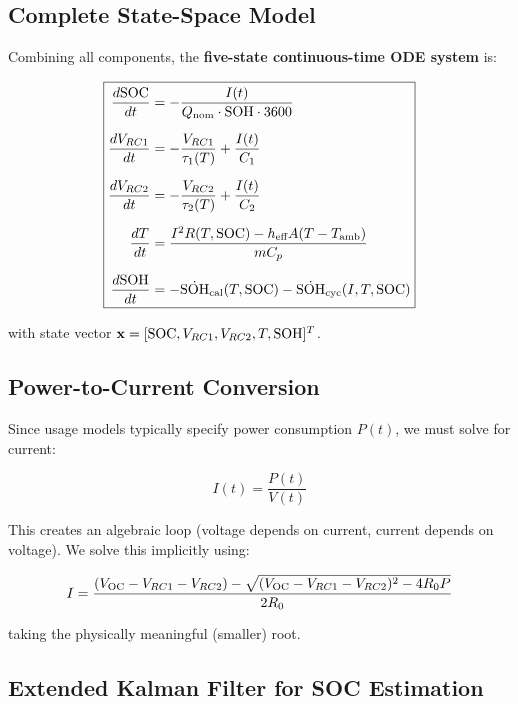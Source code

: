 \subsection{Complete State-Space Model}
\label{subsec:statespace}

Combining all components, the \textbf{five-state continuous-time ODE system} is:

\begin{equation}
    \boxed{
    \begin{aligned}
        \frac{d\text{SOC}}{dt} &= -\frac{I(t)}{Q_{\text{nom}} \cdot \text{SOH} \cdot 3600} \\[6pt]
        \frac{dV_{RC1}}{dt} &= -\frac{V_{RC1}}{\tau_1(T)} + \frac{I(t)}{C_1} \\[6pt]
        \frac{dV_{RC2}}{dt} &= -\frac{V_{RC2}}{\tau_2(T)} + \frac{I(t)}{C_2} \\[6pt]
        \frac{dT}{dt} &= \frac{I^2 R(T,\text{SOC}) - h_{\text{eff}}A(T-T_{\text{amb}})}{mC_p} \\[6pt]
        \frac{d\text{SOH}}{dt} &= -\dot{\text{SOH}}_{\text{cal}}(T, \text{SOC}) - \dot{\text{SOH}}_{\text{cyc}}(I, T, \text{SOC})
    \end{aligned}
    }
    \label{eq:full_ode}
\end{equation}

with state vector $\mathbf{x} = [\text{SOC}, V_{RC1}, V_{RC2}, T, \text{SOH}]^T$.

\subsection{Power-to-Current Conversion}
\label{subsec:power_current}

Since usage models typically specify power consumption $P(t)$, we must solve for current:

\begin{equation}
    I(t) = \frac{P(t)}{V(t)}
\end{equation}

This creates an algebraic loop (voltage depends on current, current depends on voltage). We solve this implicitly using:

\begin{equation}
    I = \frac{(V_{\text{OC}} - V_{RC1} - V_{RC2}) - \sqrt{(V_{\text{OC}} - V_{RC1} - V_{RC2})^2 - 4R_0 P}}{2R_0}
    \label{eq:current_solve}
\end{equation}

taking the physically meaningful (smaller) root.

\subsection{Extended Kalman Filter for SOC Estimation}
\label{subsec:ekf}

